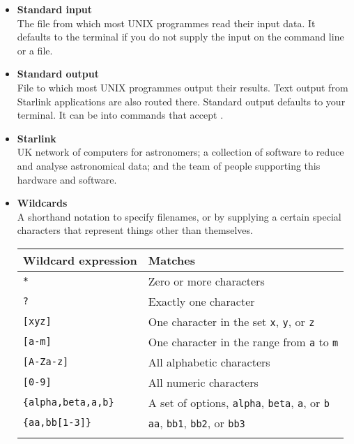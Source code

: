 \documentclass[twoside,11pt,nolof]{starlink}
\begin{document}
\begin{itemize}
\item {\bf\label{sc4_gl_std_inp}Standard input}\\
      The file from which most UNIX programmes read their input data.
      It defaults to the terminal if you do not supply the input on
      the command line or a file.

\item {\bf\label{sc4_gl_std_out}Standard output}\\
      File to which most UNIX programmes output their results.  Text
      output from Starlink applications are also routed there.
      Standard output defaults to your terminal.  It can be
       into commands that accept
      .

\item {\bf\label{sc4_gl_starlink}Starlink}\\
      UK network of computers for astronomers; a collection of
      software to reduce and analyse astronomical data; and the team
      of people supporting this hardware and software.

\item {\bf\label{sc4_gl_wild}Wildcards}\\
      A shorthand notation to specify filenames,
       or  by supplying a certain special
      characters that represent things other than themselves.
      \medskip


      \begin{tabular}{lp{100mm}}
      Wildcard expression & Matches \\ \hline
      \texttt{*} & Zero or more characters \\
      \texttt{?} & Exactly one character \\
      \texttt{[xyz]} & One character in the set \texttt{x}, \texttt{y}, or \texttt{z} \\
      \texttt{[a-m]} & One character in the range from \texttt{a} to \texttt{m} \\
      \texttt{[A-Za-z]} & All alphabetic characters \\
      \texttt{[0-9]} & All numeric characters \\
      \texttt{\{alpha,beta,a,b\}} & A set of options, \texttt{alpha}, \texttt{beta}, \texttt{a}, or \texttt{b} \\
      \texttt{\{aa,bb[1-3]\}} & \texttt{aa}, \texttt{bb1}, \texttt{bb2}, or \texttt{bb3} \\
      \\ \hline
      \end{tabular}


\end{itemize}
\end{document}
